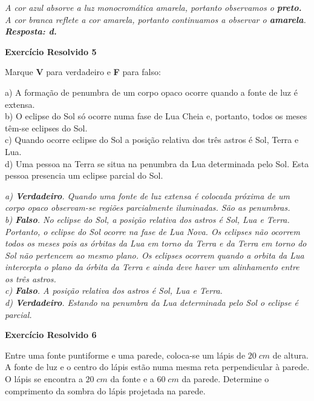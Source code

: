 \documentclass[11pt,twocolumn,oneside]{article}
\newenvironment{resposta*}
  {\bf Resposta:\\ }
  {}
\begin{document}
\begin{resposta*}
{\it A cor azul absorve a luz monocromática amarela, portanto observamos o \textbf{preto.} A cor branca reflete a cor amarela, portanto continuamos a observar o \textbf{amarela}. \\
\textbf{Resposta: d.}}
\end{resposta*}

\textbf{Exercício Resolvido 5}


Marque \textbf{V} para verdadeiro e \textbf{F} para falso:


a) A formação de penumbra de um corpo opaco ocorre quando a fonte de luz é extensa. \\
b) O eclipse do Sol só ocorre numa fase de Lua Cheia e, portanto, todos os meses têm-se eclipses do Sol. \\
c) Quando ocorre eclipse do Sol a posição relativa dos três astros é Sol, Terra e Lua. \\
d) Uma pessoa na Terra se situa na penumbra da Lua determinada pelo Sol. Esta pessoa presencia um eclipse parcial do Sol. \\


\begin{resposta*}
{\it a) \textbf{Verdadeiro}. Quando uma fonte de luz extensa é colocada próxima de um corpo opaco observam-se regiões parcialmente iluminadas. São as penumbras. \\
b) \textbf{Falso}. No eclipse do Sol, a posição relativa dos astros é Sol, Lua e Terra. Portanto, o eclipse do Sol ocorre na fase de Lua Nova. Os eclipses não ocorrem todos os meses pois as órbitas da Lua em torno da Terra e da Terra em torno do Sol não pertencem ao mesmo plano. Os eclipses ocorrem quando a orbita da Lua intercepta o plano da órbita da Terra e ainda deve haver um alinhamento entre os três astros. \\
c) \textbf{Falso}. A posição relativa dos astros é Sol, Lua e Terra. \\
d) \textbf{Verdadeiro}. Estando na penumbra da Lua determinada pelo Sol o eclipse é parcial. \\}
\end{resposta*}

\textbf{Exercício Resolvido 6}


Entre uma fonte puntiforme e uma parede, coloca-se um lápis de $20\;cm$ de altura. A fonte de luz e o centro do lápis estão numa mesma reta perpendicular à parede. O lápis se encontra a $20\;cm$ da fonte e a $60\;cm$ da parede. Determine o comprimento da sombra do lápis projetada na parede.
\end{document}
